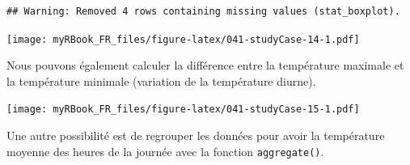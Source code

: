 \documentclass[]{book}
\newenvironment{Shaded}{\begin{snugshade}}{\end{snugshade}}
\newcommand{\DataTypeTok}[1]{\textcolor[rgb]{0.13,0.29,0.53}{#1}}
\newcommand{\DecValTok}[1]{\textcolor[rgb]{0.00,0.00,0.81}{#1}}
\newcommand{\KeywordTok}[1]{\textcolor[rgb]{0.13,0.29,0.53}{\textbf{#1}}}
\newcommand{\NormalTok}[1]{#1}
\newcommand{\OperatorTok}[1]{\textcolor[rgb]{0.81,0.36,0.00}{\textbf{#1}}}
\newcommand{\StringTok}[1]{\textcolor[rgb]{0.31,0.60,0.02}{#1}}
\begin{document}
\begin{verbatim}
## Warning: Removed 4 rows containing missing values (stat_boxplot).
\end{verbatim}

\texttt{[image: myRBook\_FR\_files/figure-latex/041-studyCase-14-1.pdf]}

Nous pouvons également calculer la différence entre la température maximale et la température minimale (variation de la température diurne).

\begin{Shaded}
\end{Shaded}

\texttt{[image: myRBook\_FR\_files/figure-latex/041-studyCase-15-1.pdf]}

Une autre possibilité est de regrouper les données pour avoir la température moyenne des heures de la journée avec la fonction \texttt{aggregate()}.
\end{document}
